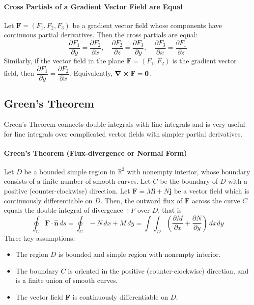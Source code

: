 \paragraph{Cross Partials of a Gradient Vector Field are Equal}
Let \(\textbf{F} = (F_1, F_2, F_3)\) be a gradient vector field whose components have continuous partial derivatives. Then the cross partials are equal:
\[\frac{\partial F_1}{\partial y} = \frac{\partial F_2}{\partial x}, \quad \frac{\partial F_2}{\partial z} = \frac{\partial F_3}{\partial y}, \quad \frac{\partial F_3}{\partial x} = \frac{\partial F_1}{\partial z}\]
Similarly, if the vector field in the plane \(\textbf{F} = (F_1, F_2)\) is the gradient vector field, then \(\dfrac{\partial F_1}{\partial y} = \dfrac{\partial F_2}{\partial x}\). Equivalently, \(\curl \textbf{F} = \textbf{0}\).

\subsection{Green's Theorem}
Green's Theorem connects double integrals with line integrals and is very useful for line integrals over complicated vector fields with simpler partial derivatives. 

\paragraph{Green's Theorem (Flux-divergence or Normal Form)}
Let \(D\) be a bounded simple region in \(\mathbb R^2\) with nonempty interior, whose boundary consists of a finite number of smooth curves. Let \(C\) be the boundary of \(D\) with a positive (counter-clockwise) direction. Let \(\textbf{F} = M\textbf{i} + N\textbf{j}\) be a vector field which is continuously differentiable on \(D\).  Then, the outward flux of \(\textbf{F}\) across the curve \(C\) equals the double integral of divergence \(\div F\) over \(D\), that is
\[\oint_C \textbf{F} \cdot \hat{\textbf{n}} \, ds = \oint_C - N \, dx + M \, dy = \int\int_D \left(\frac{\partial M}{\partial x} + \frac{\partial N}{\partial y} \right) \, dxdy\]
Three key assumptions:
\begin{itemize}
    \item The region \(D\) is bounded and simple region with nonempty interior.
    \item The boundary \(C\) is oriented in the positive (counter-clockwise) direction, and is a finite union of smooth curves.
    \item The vector field \textbf{F} is continuously differentiable on \(D\).
\end{itemize}

